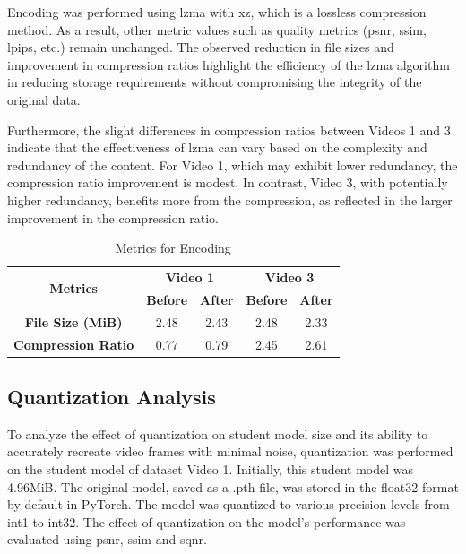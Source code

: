 \documentclass{ioereport}
\begin{document}
    Encoding was performed using \gls{lzma} with xz, which is a lossless compression method. As a result, other metric values such as quality metrics (\gls{psnr}, \gls{ssim}, \gls{lpips}, etc.) remain unchanged. The observed reduction in file sizes and improvement in compression ratios highlight the efficiency of the \gls{lzma} algorithm in reducing storage requirements without compromising the integrity of the original data.
    
    Furthermore, the slight differences in compression ratios between Videos 1 and 3 indicate that the effectiveness of \gls{lzma} can vary based on the complexity and redundancy of the content. For Video 1, which may exhibit lower redundancy, the compression ratio improvement is modest. In contrast, Video 3, with potentially higher redundancy, benefits more from the compression, as reflected in the larger improvement in the compression ratio.

    \begin{table}[H]
        \centering
        \caption{Metrics for Encoding}
        \label{tab:encoding-result}
        \begin{tabular}{|c|c|c|c|c|}
            \hline
            \multirow{2}{*}{\textbf{Metrics}} & \multicolumn{2}{c|}{\textbf{Video 1}} & \multicolumn{2}{c|}{\textbf{Video 3}} \\ \cline{2-5}
            & \textbf{Before} & \textbf{After} & \textbf{Before} & \textbf{After} \\ \hline
            \textbf{File Size (MiB)} & 2.48 & 2.43 & 2.48 & 2.33 \\ \hline
            \textbf{Compression Ratio} & 0.77 & 0.79 & 2.45 & 2.61 \\ \hline
        \end{tabular}
    \end{table}
    

    \subsection{Quantization Analysis}
    To analyze the effect of quantization on student model size and its ability to accurately recreate video frames with minimal noise, quantization was performed on the student model of dataset Video 1. Initially, this student model was 4.96MiB. The original model, saved as a .pth file, was stored in the float32 format by default in PyTorch. The model was quantized to various precision levels from int1 to int32. The effect of quantization on the model's performance was evaluated using \gls{psnr}, \gls{ssim} and \gls{sqnr}.
\end{document}
